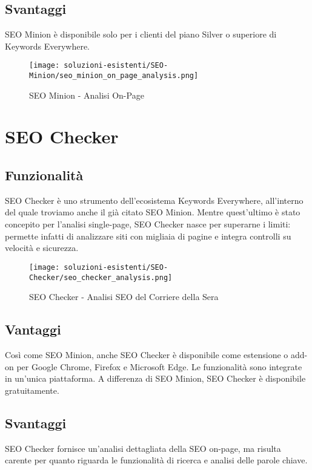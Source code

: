 \subsection{Svantaggi}
\par SEO Minion è disponibile solo per i clienti del piano Silver o superiore di Keywords Everywhere.

\begin{figure}[H]
    \centering 
    \texttt{[image: soluzioni-esistenti/SEO-Minion/seo\_minion\_on\_page\_analysis.png]} 
    \caption{SEO Minion - Analisi On-Page}
\end{figure}

\section{SEO Checker}

\subsection{Funzionalità}
\par SEO Checker è uno strumento dell’ecosistema Keywords Everywhere, all’interno del quale troviamo anche il già citato SEO Minion. Mentre quest’ultimo è stato concepito per l’analisi single-page, SEO Checker nasce per superarne i limiti: permette infatti di analizzare siti con migliaia di pagine e integra controlli su velocità e sicurezza.

\begin{figure}[H]
    \centering 
    \texttt{[image: soluzioni-esistenti/SEO-Checker/seo\_checker\_analysis.png]} 
    \caption{SEO Checker - Analisi SEO del Corriere della Sera}
\end{figure}

\subsection{Vantaggi}
\par Così come SEO Minion, anche SEO Checker è disponibile come estensione o add-on per Google Chrome, Firefox e Microsoft Edge. Le funzionalità sono integrate in un'unica piattaforma. A differenza di SEO Minion, SEO Checker è disponibile gratuitamente.

\subsection{Svantaggi}
\par SEO Checker fornisce un'analisi dettagliata della SEO on-page, ma risulta carente per quanto riguarda le funzionalità di ricerca e analisi delle parole chiave.

